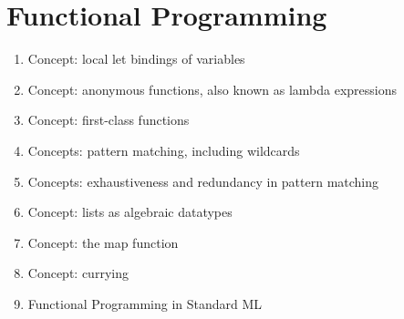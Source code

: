 \section{Functional Programming}\label{sec:Functional_Programming}

\begin{enumerate}[noitemsep]
\item Concept: local let bindings of variables
\item Concept: anonymous functions, also known as lambda expressions
\item Concept: first-class functions
\item Concepts: pattern matching, including wildcards
\item Concepts: exhaustiveness and redundancy in pattern matching
\item Concept: lists as algebraic datatypes
\item Concept: the map function
\item Concept: currying
\item Functional Programming in Standard ML
\end{enumerate}

